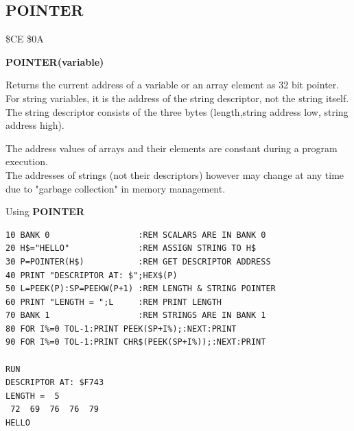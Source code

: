 \subsection{POINTER}
\begin{description}[leftmargin=2cm,style=nextline]
\item [Token:] \$CE \$0A
\item [Format:] {\bf POINTER(variable)}
\item [Usage:]  Returns the current address of a variable
                or an array element as 32 bit pointer.
                For string variables, it is the address of
                the string descriptor, not the string itself.
                The string descriptor consists of the three bytes
                (length,string address low, string address high).

\item [Remarks:] The address values of arrays and their elements
                 are constant during a program execution. \\
                 The addresses of strings (not their descriptors)
                 however may change at any time due to
                 "garbage collection" in memory management.

\item [Example:] Using {\bf POINTER}

\begin{tcolorbox}[colback=black,coltext=white]
\verbatimfont{\codefont}
\begin{verbatim}
10 BANK 0                  :REM SCALARS ARE IN BANK 0
20 H$="HELLO"              :REM ASSIGN STRING TO H$
30 P=POINTER(H$)           :REM GET DESCRIPTOR ADDRESS
40 PRINT "DESCRIPTOR AT: $";HEX$(P)
50 L=PEEK(P):SP=PEEKW(P+1) :REM LENGTH & STRING POINTER
60 PRINT "LENGTH = ";L     :REM PRINT LENGTH
70 BANK 1                  :REM STRINGS ARE IN BANK 1
80 FOR I%=0 TOL-1:PRINT PEEK(SP+I%);:NEXT:PRINT
90 FOR I%=0 TOL-1:PRINT CHR$(PEEK(SP+I%));:NEXT:PRINT

RUN
DESCRIPTOR AT: $F743
LENGTH =  5
 72  69  76  76  79
HELLO
\end{verbatim}
\end{tcolorbox}
\end{description}


\newpage
